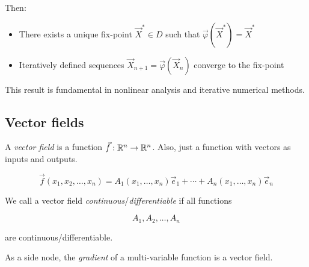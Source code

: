 Then:

\begin{itemize}
    \item There exists a unique fix-point \( \vec{X}^* \in D \) such that 
    \( \vec{\varphi}(\vec{X}^*) = \vec{X}^* \)
    \item Iteratively defined sequences \( \vec{X}_{n+1} = \vec{\varphi}(\vec{X}_n) \) converge to the 
    fix-point
\end{itemize}

This result is fundamental in nonlinear analysis and iterative numerical methods.

\subsection{Vector fields}

A \emph{vector field} is a function \(\vec{f}: \mathbb{R}^n \to \mathbb{R}^n\). Also, just a 
function with vectors as inputs and outputs.

\[
    \vec{f}(x_1, x_2, \dots, x_n) = A_1(x_1, \dots, x_n)\vec{e}_1 + \cdots + A_n(x_1, \dots, x_n)\vec{e}_n
\]

We call a vector field \emph{continuous}/\emph{differentiable} if all functions 

\[
    A_1, A_2, \dots, A_n
\] 

are continuous/differentiable.

As a side node, the \emph{gradient} of a multi-variable function is a vector field.

